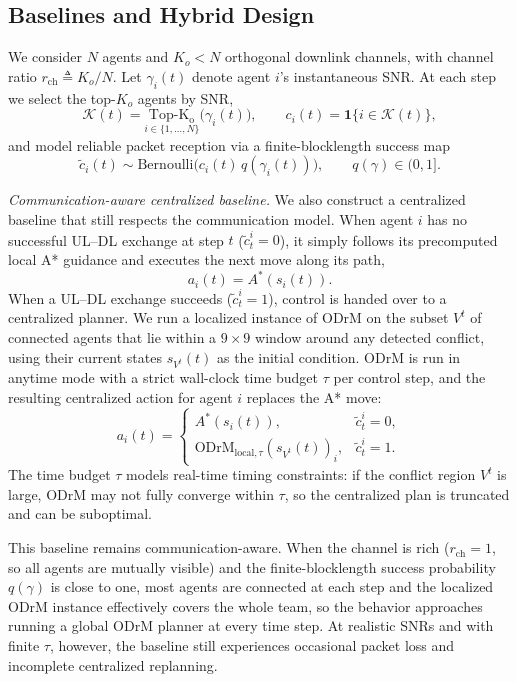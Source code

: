 \documentclass[conference]{IEEEtran}
\begin{document}
\subsection{Baselines and Hybrid Design}

We consider $N$ agents and $K_o<N$ orthogonal downlink channels, with
channel ratio $r_{\mathrm{ch}} \triangleq K_o/N$.
Let $\gamma_i(t)$ denote agent $i$'s instantaneous SNR.
At each step we select the top-$K_o$ agents by SNR,
\begin{equation}
\mathcal{K}(t)=\operatorname*{Top\text{-}K_o}_{i\in\{1,\dots,N\}}\!\big(\gamma_i(t)\big), \qquad
c_i(t)=\mathbf{1}\{i\in \mathcal{K}(t)\},
\end{equation}
and model reliable packet reception via a finite-blocklength success map
\begin{equation}
\tilde c_i(t)\sim \mathrm{Bernoulli}\!\big(c_i(t)\,q(\gamma_i(t))\big), \qquad q(\gamma)\in(0,1].
\end{equation}

\emph{Communication-aware centralized baseline.}
We also construct a centralized baseline that still respects the communication model. When agent $i$ has no successful UL--DL exchange at step $t$ ($\tilde c_t^i = 0$), it simply follows its precomputed local A* guidance and executes the next move along its path,
\[
a_i(t) = A^*(s_i(t)).
\]
When a UL--DL exchange succeeds ($\tilde c_t^i = 1$), control is handed over to a centralized planner. We run a localized instance of ODrM on the subset $V^t$ of connected agents that lie within a $9\times 9$ window around any detected conflict, using their current states $s_{V^t}(t)$ as the initial condition. ODrM is run in anytime mode with a strict wall-clock time budget $\tau$ per control step, and the resulting centralized action for agent $i$ replaces the A* move:
\[
a_i(t) =
\begin{cases}
A^*(s_i(t)), & \tilde c_t^i = 0,\\[3pt]
\text{ODrM}_{\text{local},\tau}(s_{V^t}(t))_i, & \tilde c_t^i = 1.
\end{cases}
\tag{14}
\]
The time budget $\tau$ models real-time timing constraints: if the conflict region $V^t$ is large, ODrM may not fully converge within $\tau$, so the centralized plan is truncated and can be suboptimal.

This baseline remains communication-aware. When the channel is rich ($r_{\mathrm{ch}} = 1$, so all agents are mutually visible) and the finite-blocklength success probability $q(\gamma)$ is close to one, most agents are connected at each step and the localized ODrM instance effectively covers the whole team, so the behavior approaches running a global ODrM planner at every time step. At realistic SNRs and with finite $\tau$, however, the baseline still experiences occasional packet loss and incomplete centralized replanning.
\end{document}

